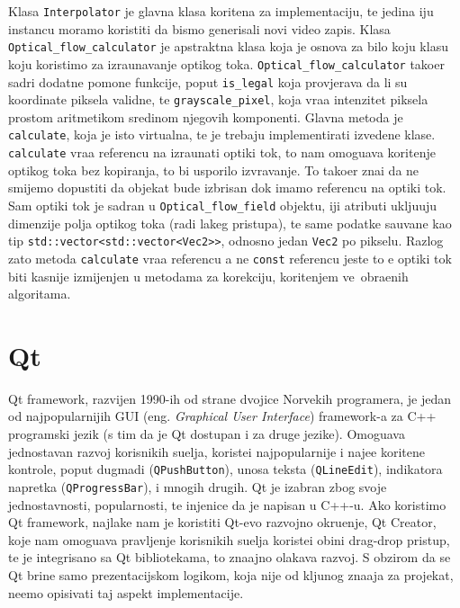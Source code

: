 Klasa \lstinline{Interpolator} je glavna klasa kori\sh tena za implementaciju, te jedina \ch iju instancu moramo koristiti da bismo generisali novi video zapis. Klasa \lstinline{Optical_flow_calculator}
je apstraktna klasa koja je osnova za bilo koju klasu koju koristimo za izra\ch unavanje opti\ch kog toka. \lstinline{Optical_flow_calculator} tako\dj er sadr\zh i dodatne pomo\cj ne funkcije, poput
\lstinline{is_legal} koja provjerava da li su koordinate piksela validne, te \lstinline{grayscale_pixel}, koja vra\cj a intenzitet piksela prostom aritmeti\ch kom sredinom njegovih komponenti.
Glavna metoda je \lstinline{calculate}, koja je \ch isto virtualna, te je trebaju implementirati izvedene klase. \lstinline{calculate} vra\cj a referencu na izra\ch unati opti\ch ki tok, \sh to nam omogu\cj ava
kori\sh tenje opti\ch kog toka bez kopiranja, \sh to bi usporilo izvr\sh avanje. To tako\dj er zna\ch i da ne smijemo dopustiti da objekat bude izbrisan dok imamo referencu na opti\ch ki tok.
Sam opti\ch ki tok je sadr\zh an u \lstinline{Optical_flow_field} objektu, \ch iji atributi uklju\ch uju dimenzije polja opti\ch kog toka (radi lak\sh eg pristupa), te same podatke sa\ch uvane kao tip
\lstinline{std::vector<std::vector<Vec2>>}, odnosno jedan \lstinline{Vec2} po pikselu. Razlog za\sh to metoda \lstinline{calculate} vra\cj a referencu a ne \lstinline{const} referencu jeste \sh to \cj e
opti\ch ki tok biti kasnije izmijenjen u metodama za korekciju, kori\sh tenjem ve\cj\ obra\dj enih algoritama.

\section{Qt} %
Qt framework, razvijen 1990-ih od strane dvojice Norve\sh kih programera, je jedan od najpopularnijih GUI (eng. \textit{Graphical User Interface}) framework-a za C++ programski jezik (s tim da je
Qt dostupan i za druge jezike). Omogu\cj ava jednostavan razvoj korisni\ch kih su\ch elja, koriste\cj i najpopularnije i naj\ch e\sh \cj e kori\sh tene kontrole, poput dugmadi (\lstinline{QPushButton}),
unosa teksta (\lstinline{QLineEdit}), indikatora napretka (\lstinline{QProgressBar}), i mnogih drugih. Qt je izabran zbog svoje jednostavnosti, popularnosti, te \ch injenice da je napisan u C++-u.
Ako koristimo Qt framework, najlak\sh e nam je koristiti Qt-evo razvojno okru\zh enje, Qt Creator, koje nam omogu\cj ava pravljenje korisni\ch kih su\ch elja koriste\cj i obi\ch ni drag-drop pristup,
te je integrisano sa Qt bibliotekama, \sh to zna\ch ajno olak\sh ava razvoj.
S obzirom da se Qt brine samo prezentacijskom logikom, koja nije od klju\ch nog zna\ch aja za projekat, ne\cj emo opisivati taj aspekt implementacije.

